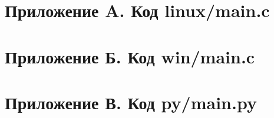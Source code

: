 \setcounter{secnumdepth}{-1}

\section{Приложение A. Код linux/main.c}

\newpage

\section{Приложение Б. Код win/main.c}

\newpage

\section{Приложение В. Код py/main.py}

\newpage
